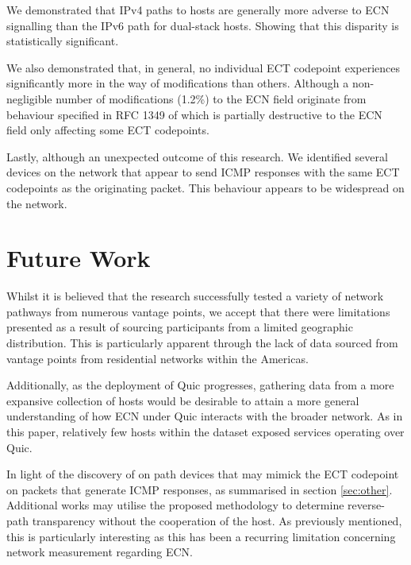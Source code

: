 \documentclass{l4proj}
\begin{document}
We demonstrated that IPv4 paths to hosts are generally more adverse to ECN signalling than the IPv6 path for dual-stack hosts. Showing that this disparity is statistically significant.

We also demonstrated that, in general, no individual ECT codepoint experiences significantly more in the way of modifications than others. Although a non-negligible number of modifications (1.2\%) to the ECN field originate from behaviour specified in RFC 1349\cite{rfc1349} of which is partially destructive to the ECN field only affecting some ECT codepoints.

Lastly, although an unexpected outcome of this research. We identified several devices on the network that appear to send ICMP responses with the same ECT codepoints as the originating packet. This behaviour appears to be widespread on the network.



\section{Future Work}

Whilst it is believed that the research successfully tested a variety of network pathways from numerous vantage points, we accept that there were limitations presented as a result of sourcing participants from a limited geographic distribution. This is particularly apparent through the lack of data sourced from vantage points from residential networks within the Americas.

Additionally, as the deployment of Quic progresses, gathering data from a more expansive collection of hosts would be desirable to attain a more general understanding of how ECN under Quic interacts with the broader network. As in this paper, relatively few hosts within the dataset exposed services operating over Quic.

In light of the discovery of on path devices that may mimick the ECT codepoint on packets that generate ICMP responses, as summarised in section \ref{sec:other}. Additional works may utilise the proposed methodology to determine reverse-path transparency without the cooperation of the host. As previously mentioned, this is particularly interesting as this has been a recurring limitation concerning network measurement regarding ECN.


%
% 
\end{document}
